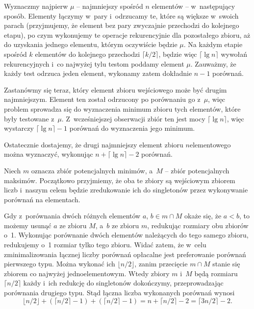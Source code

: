 
\exercise %
Wyznaczmy najpierw $\mu$ -- najmniejszy spośród $n$ elementów -- w~następujący sposób.
Elementy łączymy w~pary i~odrzucamy te, które są większe w~swoich parach (przyjmujemy, że element bez pary zwyczajnie przechodzi do kolejnego etapu), po czym wykonujemy te operacje rekurencyjnie dla pozostałego zbioru, aż do uzyskania jednego elementu, którym oczywiście będzie $\mu$.
Na każdym etapie spośród $k$ elementów do kolejnego przechodzi $\lceil k/2\rceil$, będzie więc $\lceil\lg n\rceil$ wywołań rekurencyjnych i~co najwyżej tylu testom poddamy element $\mu$.
Zauważmy, że każdy test odrzuca jeden element, wykonamy zatem dokładnie $n-1$ porównań.

Zastanówmy się teraz, który element zbioru wejściowego może być drugim najmniejszym.
Element ten został odrzucony po porównaniu go z~$\mu$, więc problem sprowadza się do wyznaczenia minimum zbioru tych elementów, które były testowane z~$\mu$.
Z~wcześniejszej obserwacji zbiór ten jest mocy $\lceil\lg n\rceil$, więc wystarczy $\lceil\lg n\rceil-1$ porównań do wyznaczenia jego minimum.

Ostatecznie dostajemy, że drugi najmniejszy element zbioru $n$\nbhyphen elementowego można wyznaczyć, wykonując $n+\lceil\lg n\rceil-2$ porównań.

\exercise %
Niech $m$ oznacza zbiór potencjalnych minimów, a~$M$ -- zbiór potencjalnych maksimów.
Początkowo przyjmiemy, że oba te zbiory są wejściowym zbiorem liczb i~naszym celem będzie zredukowanie ich do singletonów przez wykonywanie porównań na elementach.

Gdy z~porównania dwóch różnych elementów $a$, $b\in m\cap M$ okaże się, że $a<b$, to możemy usunąć $a$ ze zbioru $M$, a~$b$ ze zbioru $m$, redukując rozmiary obu zbiorów o~1.
Wykonując porównanie dwóch elementów należących do tego samego zbioru, redukujemy o~1 rozmiar tylko tego zbioru.
Widać zatem, że w~celu zminimalizowania łącznej liczby porównań opłacalne jest preferowanie porównań pierwszego typu.
Można wykonać ich $\lfloor n/2\rfloor$, zanim przecięcie $m\cap M$ stanie się zbiorem co najwyżej jednoelementowym.
Wtedy zbiory $m$ i~$M$ będą rozmiaru $\lceil n/2\rceil$ każdy i~ich redukcję do singletonów dokończymy, przeprowadzając porównania drugiego typu.
Stąd łączna liczba wykonanych porównań wynosi
\[
    \lfloor n/2\rfloor+(\lceil n/2\rceil-1)+(\lceil n/2\rceil-1) = n+\lceil n/2\rceil-2 = \lceil3n/2\rceil-2.
\]
